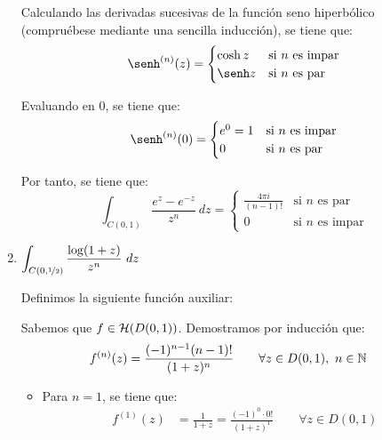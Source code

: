 \begin{ejercicio}
\begin{enumerate}
        Calculando las derivadas sucesivas de la función seno hiperbólico (compruébese mediante una sencilla inducción), se tiene que:
        \begin{equation*}
            \senh^{(n)}(z) = \begin{cases}
                \cosh z & \text{si } n\text{ es impar}\\
                \senh z & \text{si } n\text{ es par}
            \end{cases}
        \end{equation*}

        Evaluando en $0$, se tiene que:
        \begin{equation*}
            \senh^{(n)}(0) = \begin{cases}
                e^0=1 & \text{si } n\text{ es impar}\\
                0 & \text{si } n\text{ es par}
            \end{cases}
        \end{equation*}

        Por tanto, se tiene que:
        \begin{equation*}
            \int_{C(0,1)} \frac{e^z - e^{-z}}{z^n}\ dz = \begin{cases}
                \frac{4\pi i}{(n-1)!} & \text{si } n\text{ es par}\\
                0 & \text{si } n\text{ es impar}
            \end{cases}
        \end{equation*}
            
        \item $\displaystyle\int_{C(0,\nicefrac{1}{2})} \frac{\log(1+z)}{z^n}\ dz$
        
        Definimos la siguiente función auxiliar:

        Sabemos que $f\in \mathcal{H}(D(0,1))$. Demostramos por inducción que:
        \begin{align*}
            f^{(n)}(z) &= \frac{(-1)^{n-1}(n-1)!}{(1+z)^n} \qquad \forall z\in D(0,1),\ n\in \mathbb{N}
        \end{align*}
        \begin{itemize}
            \item Para $n=1$, se tiene que:
            \begin{align*}
                f^{(1)}(z) &= \frac{1}{1+z} = \frac{(-1)^{0}\cdot 0!}{(1+z)^1} \qquad \forall z\in D(0,1)
            \end{align*}


\end{itemize}
\end{enumerate}
\end{ejercicio}
